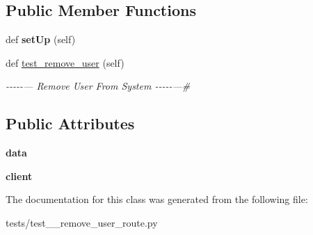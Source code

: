 \subsection*{Public Member Functions}
\begin{DoxyCompactItemize}
\item 
\mbox{\label{classtests_1_1test__12__remove__user__route_1_1_test_user_routes_acc5850df5f127b456421645d163d651b}} 
def {\bfseries set\+Up} (self)
\item 
\mbox{\label{classtests_1_1test__12__remove__user__route_1_1_test_user_routes_a5231432a4fe390ec295e86878dda9504}} 
def \hyperlink{classtests_1_1test__12__remove__user__route_1_1_test_user_routes_a5231432a4fe390ec295e86878dda9504}{test\+\_\+remove\+\_\+user} (self)
\begin{DoxyCompactList}\small\item\em -\/-\/-\/-\/-\/--- Remove User From System -\/-\/-\/-\/-\/---\# \end{DoxyCompactList}\end{DoxyCompactItemize}
\subsection*{Public Attributes}
\begin{DoxyCompactItemize}
\item 
\mbox{\label{classtests_1_1test__12__remove__user__route_1_1_test_user_routes_a50ad0e8b71fbace7abfca6526345acef}} 
{\bfseries data}
\item 
\mbox{\label{classtests_1_1test__12__remove__user__route_1_1_test_user_routes_af5e6a4f409e4a00562e66876c3f8a459}} 
{\bfseries client}
\end{DoxyCompactItemize}


The documentation for this class was generated from the following file\+:\begin{DoxyCompactItemize}
\item 
tests/test\+\_\+\_\+remove\+\_\+user\+\_\+route.\+py\end{DoxyCompactItemize}
